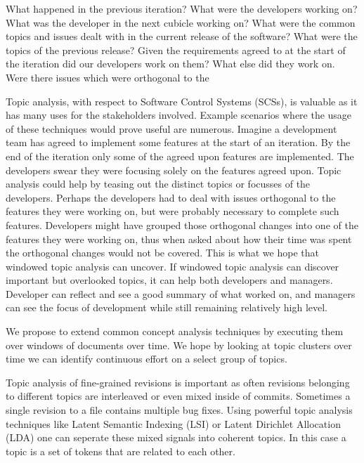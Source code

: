 \documentclass[times, 10pt,twocolumn]{article}
\begin{document}




What happened in the previous iteration? What were the developers
working on? What was the developer in the next cubicle working on?
What were the common topics and issues dealt with in the current
release of the software? What were the topics of the previous release?
Given the requirements agreed to at the start of the iteration did our
developers work on them? What else did they work on. Were there issues
which were orthogonal to the

Topic analysis, with respect to Software Control Systems (SCSs), is
valuable as it has many uses for the stakeholders involved.  Example
scenarios where the usage of these techniques would prove useful are
numerous. Imagine a development team has agreed to implement some
features at the start of an iteration. By the end of the iteration
only some of the agreed upon features are implemented. The developers
swear they were focusing solely on the features agreed upon. Topic
analysis could help by teasing out the distinct topics or focusses of
the developers. Perhaps the developers had to deal with issues
orthogonal to the features they were working on, but were probably
necessary to complete such features. Developers might have grouped
those orthogonal changes into one of the features they were working
on, thus when asked about how their time was spent the orthogonal
changes would not be covered. This is what we hope that windowed topic
analysis can uncover. If windowed topic analysis can discover
important but overlooked topics, it can help both developers and
managers. Developer can reflect and see a good summary of what worked
on, and managers can see the focus of development while still
remaining relatively high level.



We propose to extend common concept analysis techniques by executing
them over windows of documents over time. We hope by looking at topic
clusters over time we can identify continuous effort on a select
group of topics.

Topic analysis of fine-grained revisions is important as often
revisions belonging to different topics are interleaved or even mixed
inside of commits.  Sometimes a single revision to a file contains
multiple bug fixes.  Using powerful topic analysis techniques like
Latent Semantic Indexing (LSI) or Latent Dirichlet Allocation (LDA)
one can seperate these mixed signals into coherent topics. In this
case a topic is a set of tokens that are related to each other.
\end{document}
